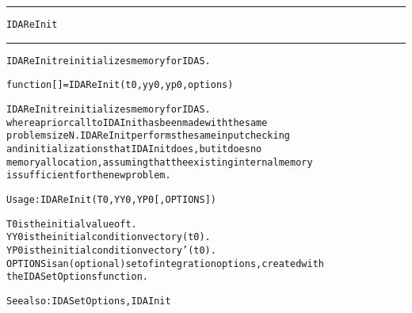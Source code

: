 \begin{samepage}
\hrule
\begin{center}
{\large \verb!IDAReInit!}
\label{p:IDAReInit}
\end{center}
\hrule\vspace{0.1in}



\begin{alltt}
IDAReInit reinitializes memory for IDAS.
\end{alltt}

\end{samepage}



\begin{samepage}


\begin{alltt}
function [] = IDAReInit(t0,yy0,yp0,options) 
\end{alltt}

\end{samepage}



\begin{alltt}
IDAReInit reinitializes memory for IDAS.
   where a prior call to IDAInit has been made with the same
   problem size N. IDAReInit performs the same input checking
   and initializations that IDAInit does, but it does no 
   memory allocation, assuming that the existing internal memory 
   is sufficient for the new problem.

   Usage: IDAReInit ( T0, YY0, YP0 [, OPTIONS ] ) 

   T0       is the initial value of t.
   YY0      is the initial condition vector y(t0).  
   YP0      is the initial condition vector y'(t0).  
   OPTIONS  is an (optional) set of integration options, created with
            the IDASetOptions function. 

  See also: IDASetOptions, IDAInit
\end{alltt}






\vspace{0.1in}